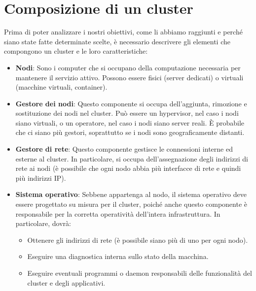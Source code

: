 
\section{Composizione di un cluster}
Prima di poter analizzare i nostri obiettivi, come li abbiamo raggiunti e perché siano state fatte determinate scelte, è necessario descrivere gli elementi che compongono un cluster e le loro caratteristiche:

\begin{itemize}
    \item \textbf{Nodi}: Sono i computer che si occupano della computazione necessaria per mantenere il servizio attivo. Possono essere fisici (server dedicati) o virtuali (macchine virtuali, container).
    \item \textbf{Gestore dei nodi}: Questo componente si occupa dell'aggiunta, rimozione e sostituzione dei nodi nel cluster. Può essere un hypervisor, nel caso i nodi siano virtuali, o un operatore, nel caso i nodi siano server reali. È probabile che ci siano più gestori, soprattutto se i nodi sono geograficamente distanti.
    \item \textbf{Gestore di rete}: Questo componente gestisce le connessioni interne ed esterne al cluster. In particolare, si occupa dell'assegnazione degli indirizzi di rete ai nodi (è possibile che ogni nodo abbia più interfacce di rete e quindi più indirizzi IP).
    \item \textbf{Sistema operativo}: Sebbene appartenga al nodo, il sistema operativo deve essere progettato su misura per il cluster, poiché anche questo componente è responsabile per la corretta operatività dell'intera infrastruttura. In particolare, dovrà:
    \begin{itemize}
        \item Ottenere gli indirizzi di rete (è possibile siano più di uno per ogni nodo).
        \item Eseguire una diagnostica interna sullo stato della macchina.
        \item Eseguire eventuali programmi o daemon responsabili delle funzionalità del cluster e degli applicativi.
    \end{itemize}
\end{itemize}
